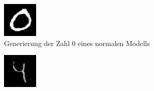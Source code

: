 \begin{figure}[H]
	\centering
	\begin{subfigure}[b]{0.35\linewidth}
		\includegraphics[width=\linewidth]{Bilder/0_rbmi.png}
		\caption{Generierung der Zahl 0 eines normalen Modells}
		\label{img:rbmi_0}
	\end{subfigure}
	\hspace{1cm} %
	\begin{subfigure}[b]{0.35\linewidth}
		\includegraphics[width=\linewidth]{Bilder/0_rbmi_dp.png}

\end{subfigure}
\end{figure}
